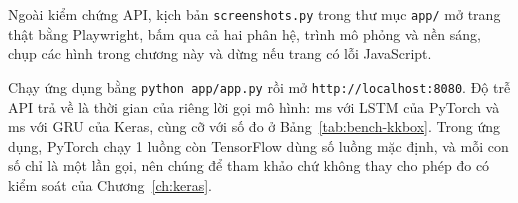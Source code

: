 
Ngoài kiểm chứng API, kịch bản \texttt{screenshots.py} trong thư mục \texttt{app/} mở trang thật bằng Playwright, bấm
qua cả hai phân hệ, trình mô phỏng và nền sáng, chụp các hình trong chương này và dừng nếu trang có lỗi JavaScript.

Chạy ứng dụng bằng \texttt{python app/app.py} rồi mở \texttt{http://localhost:8080}. Độ trễ API trả về là thời gian của riêng lời gọi mô hình:
 ms với LSTM của PyTorch và  ms với GRU của
Keras, cùng cỡ với số đo ở Bảng~\ref{tab:bench-kkbox}. Trong ứng dụng, PyTorch chạy 1 luồng còn TensorFlow dùng số luồng
mặc định, và mỗi con số chỉ là một lần gọi, nên chúng để tham khảo chứ không thay cho phép đo có kiểm soát của
Chương~\ref{ch:keras}.
